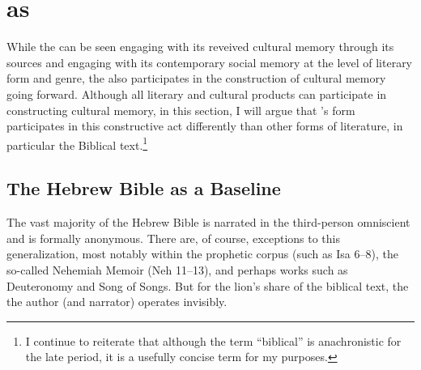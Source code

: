 
\section{\ga as \psa}

While the \ga can be seen engaging with its reveived cultural memory through its sources and engaging with its contemporary social memory at the level of literary form and genre, the \ga also participates in the construction of cultural memory going forward. Although all literary and cultural products can participate in constructing cultural memory, in this section, I will argue that \ga's \psgraphic form participates in this constructive act differently than other forms of literature, in particular the Biblical text.\footnote{I continue to reiterate that although the term ``biblical'' is anachronistic for the late \secondtemple period, it is a usefully concise term for my purposes.}


\subsection{The Hebrew Bible as a Baseline}

The vast majority of the Hebrew Bible is narrated in the third-person omniscient and is formally anonymous. There are, of course, exceptions to this generalization, most notably within the prophetic corpus (such as Isa 6--8), the so-called Nehemiah Memoir (Neh 11--13), and perhaps works such as Deuteronomy and Song of Songs. But for the lion's share of the biblical text, the the author (and narrator) operates invisibly.

